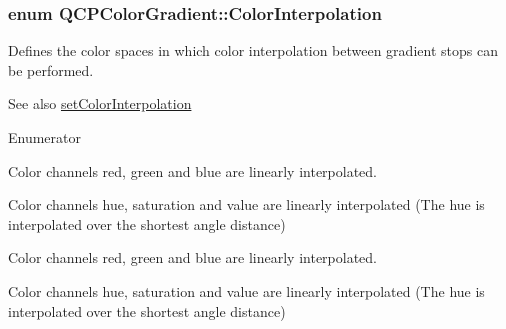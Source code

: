 \subsubsection[{\texorpdfstring{Color\+Interpolation}{ColorInterpolation}}]{\setlength{\rightskip}{0pt plus 5cm}enum {\bf Q\+C\+P\+Color\+Gradient\+::\+Color\+Interpolation}}\hypertarget{class_q_c_p_color_gradient_ac5dca17cc24336e6ca176610e7f77fc1}{}\label{class_q_c_p_color_gradient_ac5dca17cc24336e6ca176610e7f77fc1}
Defines the color spaces in which color interpolation between gradient stops can be performed.

\begin{DoxySeeAlso}{See also}
\hyperlink{class_q_c_p_color_gradient_aa13fda86406e1d896a465a409ae63b38}{set\+Color\+Interpolation} 
\end{DoxySeeAlso}
\begin{Desc}
\item[Enumerator]\par
\begin{description}
\item[{\em 
ci\+R\+GB\hypertarget{class_q_c_p_color_gradient_ac5dca17cc24336e6ca176610e7f77fc1a18d3bb189bc5ac3c9ef345dad522fde4}{}\label{class_q_c_p_color_gradient_ac5dca17cc24336e6ca176610e7f77fc1a18d3bb189bc5ac3c9ef345dad522fde4}
}]Color channels red, green and blue are linearly interpolated. \item[{\em 
ci\+H\+SV\hypertarget{class_q_c_p_color_gradient_ac5dca17cc24336e6ca176610e7f77fc1a3662ff840f7db088d58e5bdb1105e3a4}{}\label{class_q_c_p_color_gradient_ac5dca17cc24336e6ca176610e7f77fc1a3662ff840f7db088d58e5bdb1105e3a4}
}]Color channels hue, saturation and value are linearly interpolated (The hue is interpolated over the shortest angle distance) \item[{\em 
ci\+R\+GB\hypertarget{class_q_c_p_color_gradient_ac5dca17cc24336e6ca176610e7f77fc1a18d3bb189bc5ac3c9ef345dad522fde4}{}\label{class_q_c_p_color_gradient_ac5dca17cc24336e6ca176610e7f77fc1a18d3bb189bc5ac3c9ef345dad522fde4}
}]Color channels red, green and blue are linearly interpolated. \item[{\em 
ci\+H\+SV\hypertarget{class_q_c_p_color_gradient_ac5dca17cc24336e6ca176610e7f77fc1a3662ff840f7db088d58e5bdb1105e3a4}{}\label{class_q_c_p_color_gradient_ac5dca17cc24336e6ca176610e7f77fc1a3662ff840f7db088d58e5bdb1105e3a4}
}]Color channels hue, saturation and value are linearly interpolated (The hue is interpolated over the shortest angle distance) \end{description}
\end{Desc}
